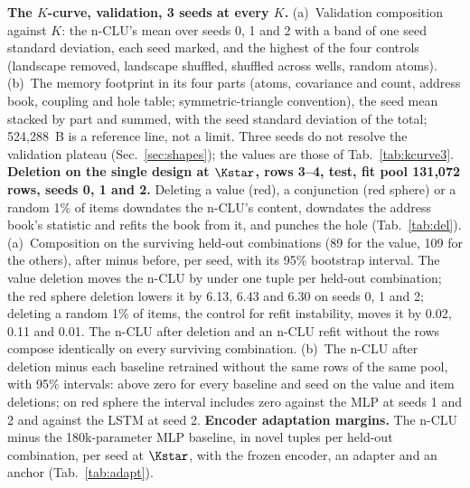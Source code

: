 \textbf{The $K$-curve, validation, 3 seeds at every $K$.} (a)~Validation composition against $K$: the n-CLU's mean over seeds 0, 1 and 2 with a band of one seed standard deviation, each seed marked, and the highest of the four controls (landscape removed, landscape shuffled, shuffled across wells, random atoms). (b)~The memory footprint in its four parts (atoms, covariance and count, address book, coupling and hole table; symmetric-triangle convention), the seed mean stacked by part and summed, with the seed standard deviation of the total; 524,288~B is a reference line, not a limit. Three seeds do not resolve the validation plateau (Sec.~\ref{sec:shapes}); the values are those of Tab.~\ref{tab:kcurve3}.
\textbf{Deletion on the single design at $\Kstar$, rows 3--4, test, fit pool 131,072 rows, seeds 0, 1 and 2.} Deleting a value (red), a conjunction (red sphere) or a random 1\% of items downdates the n-CLU's content, downdates the address book's statistic and refits the book from it, and punches the hole (Tab.~\ref{tab:del}). (a)~Composition on the surviving held-out combinations (89 for the value, 109 for the others), after minus before, per seed, with its 95\% bootstrap interval. The value deletion moves the n-CLU by under one tuple per held-out combination; the red sphere deletion lowers it by 6.13, 6.43 and 6.30 on seeds 0, 1 and 2; deleting a random 1\% of items, the control for refit instability, moves it by 0.02, 0.11 and 0.01. The n-CLU after deletion and an n-CLU refit without the rows compose identically on every surviving combination. (b)~The n-CLU after deletion minus each baseline retrained without the same rows of the same pool, with 95\% intervals: above zero for every baseline and seed on the value and item deletions; on red sphere the interval includes zero against the MLP at seeds 1 and 2 and against the LSTM at seed 2.
\textbf{Encoder adaptation margins.} The n-CLU minus the 180k-parameter MLP baseline, in novel tuples per held-out combination, per seed at $\Kstar$, with the frozen encoder, an adapter and an anchor (Tab.~\ref{tab:adapt}).
